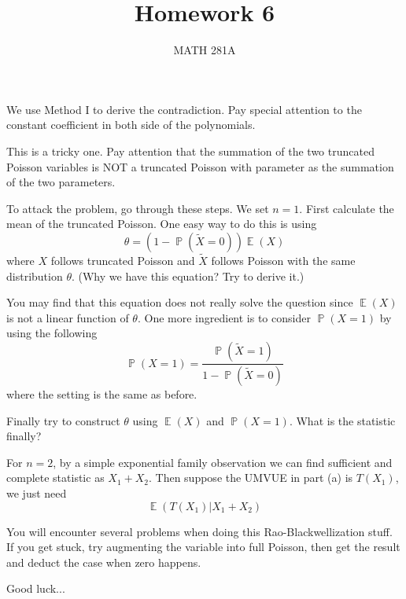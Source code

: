 \documentclass[12pt]{article}
\newenvironment{exercise}[2][Exercise]{\begin{trivlist}
\item[\hskip \labelsep {\bfseries #1}\hskip \labelsep {\bfseries #2.}]}{\end{trivlist}}
\newcommand{\E}{\operatorname{\mathbb{E}}}
\renewcommand{\P}{\operatorname{\mathbb{P}}}
\begin{document}
\title{Homework 6}%
\author{MATH 281A} %
\maketitle
\begin{exercise}{3.18}
\end{exercise}

We use Method I to derive the contradiction. Pay special attention to the constant coefficient in both side of the polynomials. 

\begin{exercise}{3.19}
\end{exercise}

This is a tricky one. Pay attention that the summation of the two truncated Poisson variables is NOT a truncated Poisson with parameter as the summation of the two parameters.

To attack the problem, go through these steps. We set $n=1$. First calculate the mean of the truncated Poisson. One easy way to do this is using
$$
\theta = (1 - \P (\tilde{X} = 0) ) \E (X)
$$
where $X$ follows truncated Poisson and $\tilde{X}$ follows Poisson with the same distribution $\theta$. (Why we have this equation? Try to derive it.)

You may find that this equation does not really solve the question since $\E(X)$ is not a linear function of $\theta$. One more ingredient is to consider $\P(X = 1)$ by using the following
$$
\P(X = 1) = \frac{\P(\tilde{X} = 1)}{1 - \P(\tilde{X} = 0)}
$$
where the setting is the same as before. 

Finally try to construct $\theta$ using $\E(X)$ and $\P(X =1)$. What is the statistic finally?

For $n =2$, by a simple exponential family observation we can find sufficient and complete statistic as $X_1 + X_2$. Then suppose the UMVUE in part (a) is $T(X_1)$, we just need
$$
\E (T(X_1) | X_1 +X_2)
$$

You will encounter several problems when doing this Rao-Blackwellization stuff. If you get stuck, try augmenting the variable into full Poisson, then get the result and deduct the case when zero happens.

Good luck...

\begin{exercise}{20(C)}
\end{exercise}
\end{document}
